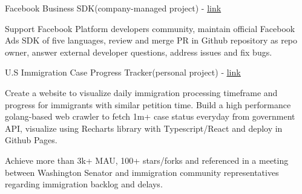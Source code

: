 


\begin{cventries}


	\compactcventry
	{Facebook Business SDK(company-managed project) - \underline{\href{https://github.com/facebook/facebook-python-business-sdk}{link}}}
	{} %
	{
		\begin{cvitems}
			\item{Support Facebook Platform developers community, maintain official Facebook Ads SDK of five languages, review and merge PR in Github repository as repo owner, answer external developer questions, address issues and fix bugs.}
		\end{cvitems}
	}

	\compactcventry
	{U.S Immigration Case Progress Tracker(personal project) - \underline{\href{https://github.com/vicdus/uscis-case-statistics/}{link}}}
	{} %
	{
		\begin{cvitems}
			\item{Create a website to visualize daily immigration processing timeframe and progress for immigrants with similar petition time. Build a high performance golang-based web crawler to fetch 1m+ case status everyday from government API, visualize using Recharts library with Typescript/React and deploy in Github Pages.}
			\item{Achieve more than 3k+ MAU, 100+ stars/forks and referenced in a meeting between Washington Senator and immigration community representatives regarding immigration backlog and delays.}
		\end{cvitems}
	}






\end{cventries}